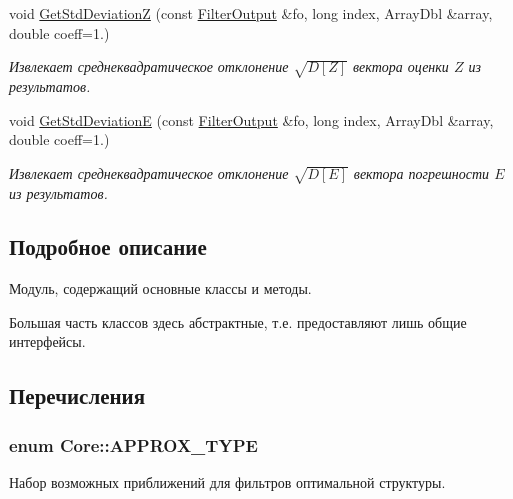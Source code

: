 \begin{DoxyCompactItemize}
void \hyperlink{namespace_core_a5e7b39380b2b293742d5eb0121af9a53}{Get\+Std\+DeviationZ} (const \hyperlink{namespace_core_a60877581a235fc9566087b54d463ce9c}{Filter\+Output} \&fo, long index, Array\+Dbl \&array, double coeff=1.)
\begin{DoxyCompactList}\small\item\em Извлекает среднеквадратическое отклонение $\sqrt{D[Z]}$ вектора оценки $Z$ из результатов. \end{DoxyCompactList}\item 
void \hyperlink{namespace_core_af3552a63b749de882ae33dbb57e6bb8c}{Get\+Std\+DeviationE} (const \hyperlink{namespace_core_a60877581a235fc9566087b54d463ce9c}{Filter\+Output} \&fo, long index, Array\+Dbl \&array, double coeff=1.)
\begin{DoxyCompactList}\small\item\em Извлекает среднеквадратическое отклонение $\sqrt{D[E]}$ вектора погрешности $E$ из результатов. \end{DoxyCompactList}\end{DoxyCompactItemize}


\subsection{Подробное описание}
Модуль, содержащий основные классы и методы. 

Большая часть классов здесь абстрактные, т.\+е. предоставляют лишь общие интерфейсы. 

\subsection{Перечисления}
\subsubsection[{\texorpdfstring{A\+P\+P\+R\+O\+X\+\_\+\+T\+Y\+PE}{APPROX_TYPE}}]{\setlength{\rightskip}{0pt plus 5cm}enum {\bf Core\+::\+A\+P\+P\+R\+O\+X\+\_\+\+T\+Y\+PE}\hspace{0.3cm}{\ttfamily [strong]}}\hypertarget{namespace_core_acd67f53ff1d9b21fabb1da4474a8f7d9}{}\label{namespace_core_acd67f53ff1d9b21fabb1da4474a8f7d9}


Набор возможных приближений для фильтров оптимальной структуры. 

